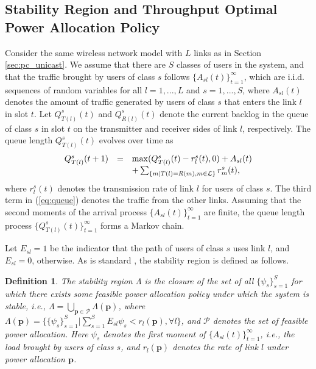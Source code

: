 \documentclass[10pt,journal,letterpaper,compsoc]{IEEEtran}
\newtheorem{defn}{Definition}
\begin{document}
{{\subsection{Stability Region and Throughput Optimal Power Allocation Policy}
Consider the same wireless network model with $L$ links as in Section \ref{sec:pc_unicast}. We assume that there are $S$ classes of users in the system, and that the traffic brought by users of class $s$ follows $\{A_{sl}(t)\}_{t=1}^\infty$, which are i.i.d. sequences of random variables for all $l=1,...,L$ and $s=1,...,S$, where $A_{sl}(t)$ denotes the amount of traffic generated by users of class $s$ that enters the link $l$ in slot $t$. Let $Q_{T(l)}^s(t)$ and $Q_{R(l)}^s(t)$ denote the current backlog in the queue of class $s$ in slot $t$ on the transmitter and receiver sides of link $l$, respectively. The queue length $Q_{T(l)}^s(t)$ evolves over time as
\begin{equation}\begin{array}
[c]{lll}Q_{T(l)}^s(t+1)&=&\max(Q_{T(l)}^s(t)-r_{l}^s(t),0)+A_{sl}(t)\\
&&+\sum_{\{m|T(l)=R(m),m\in\mathcal{L}\}}r_m^s(t),
\end{array}
\label{eq:queue}
\end{equation}
where $r_{l}^s(t)$ denotes the transmission rate of link $l$ for users of class $s$. The third term in (\ref{eq:queue}) denotes the traffic from the other links. Assuming that the second moments of the arrival process $\{A_{sl}(t)\}_{t=1}^\infty$ are finite, the queue length process $\{Q_{T(l)}^s(t)\}_{t=1}^\infty$ forms a Markov chain.

Let $E_{sl}=1$ be the indicator that the path of users of class $s$ uses link $l$, and $E_{sl}=0$, otherwise. As is standard \cite{lin:2008,ephremides:1992,neely:2005}, the stability region is defined as follows.
\begin{defn}
The stability region $\Lambda$ is the closure of the set of all $\{\psi_s\}_{s=1}^S$ for which there exists some feasible power allocation policy under which the system is stable, i.e., $\Lambda=\bigcup_{\mathbf{p}\in\mathcal{P}}{\Lambda(\mathbf{p})}$, where $\Lambda(\mathbf{p})=\{ \{\psi_s\}_{s=1}^S | \sum_{s=1}^S E_{sl}\psi_s < r_l(\mathbf{p}), \forall l\}$, and $\mathcal{P}$ denotes the set of feasible power allocation. Here $\psi_s$ denotes the first moment of $\{A_{sl}(t)\}_{t=1}^\infty$, i.e., the load brought by users of class $s$, and $r_l(\mathbf{p})$ denotes the rate of link $l$ under power allocation $\mathbf{p}$.
\end{defn}

}}
\end{document}
